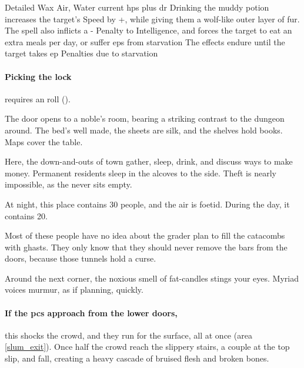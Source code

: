 \begin{multicols}{2}
  {Detailed}%
  {Wax}%
  {Air, Water}%
  {current \glspl{hp} plus \gls{dr}}%
  {Drinking the muddy potion increases the target's Speed by +, while giving them a wolf-like outer layer of fur.
  The spell also inflicts a - Penalty to Intelligence, and forces the target to eat an extra  meals per day, or suffer \glspl{ep} from starvation}%
  {The effects endure until the target takes \gls{ep} Penalties due to starvation}%

\showTalisman

\paragraph{Picking the lock}
requires an  roll (\tn[9]).

\begin{boxtext}
  The door opens to a noble's room, bearing a striking contrast to the dungeon around.
  The bed's well made, the sheets are silk, and the shelves hold books.
  Maps cover the table.
\end{boxtext}


Here, the down-and-outs of \gls{town} gather, sleep, drink, and discuss ways to make money.
Permanent residents sleep in the alcoves to the side.
Theft is nearly impossible, as the  never sits empty.

At night, this place contains 30 people, and the air is foetid.
During the day, it contains 20.

Most of these people have no idea about the grader plan to fill the catacombs with ghasts.
They only know that they should never remove the bars from the doors, because those tunnels hold a curse.

\begin{boxtext}
  Around the next corner, the noxious smell of fat-candles stings your eyes.
  Myriad voices murmur, as if planning, quickly.
\end{boxtext}

\paragraph{If the \glspl{pc} approach from the lower doors,}
this shocks the crowd, and they run for the surface, all at once (\gls{area} \vref{slum_exit}).
Once half the crowd reach the slippery stairs, a couple at the top slip, and fall, creating a heavy cascade of bruised flesh and broken bones.


\end{multicols}
